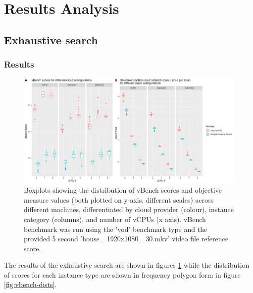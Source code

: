 \documentclass{report}
\begin{document}
\section{Results Analysis}
\subsection{Exhaustive search}
\subsubsection{Results}
\begin{figure}
  \centering
   \includegraphics[scale=0.6]{exh_search}
   \caption{Boxplots showing the distribution of vBench scores and objective measure values (both plotted on y-axis, different scales) across different machines, differentiated by cloud provider (colour), instance category (columns), and number of vCPUs (x axis). vBench benchmark was run using the 'vod' benchmark type and the provided 5 second 'house\_ 1920x1080\_ 30.mkv' video file reference score.}
  \label{fig:exh-search}
\end{figure}

The results of the exhaustive search are shown in figures \ref{fig:exh-search} while the distribution of scores for each instance type are shown in frequency polygon form in figure \ref{fig:vbench-dists}.
\end{document}
